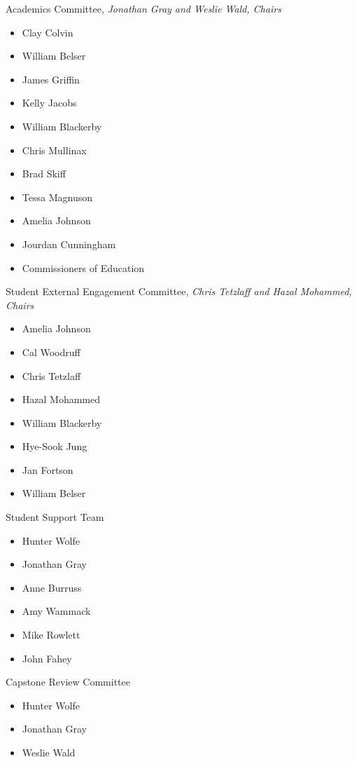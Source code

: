 Academics Committee, \emph{Jonathan Gray and Weslie Wald, Chairs}
\begin{itemize}\itemsep=0mm
  \item[] Clay Colvin
  \item[] William Belser
  \item[] James Griffin
  \item[] Kelly Jacobs
  \item[] William Blackerby
  \item[] Chris Mullinax 
  \item[] Brad Skiff 
  \item[] Tessa Magnuson    
  \item[] Amelia Johnson             
  \item[] Jourdan Cunningham
  \item[] Commissioners of Education
\end{itemize}\etc

\newpage

Student External Engagement Committee, \emph{Chris Tetzlaff and Hazal Mohammed, Chairs}
  \begin{itemize}\itemsep=0mm
    \item[] Amelia Johnson
    \item[] Cal Woodruff
    \item[] Chris Tetzlaff
    \item[] Hazal Mohammed
    \item[] William Blackerby
    \item[] Hye-Sook Jung
    \item[] Jan Fortson
    \item[] William Belser
  \end{itemize}\etc
  


Student Support Team
  \begin{itemize}\itemsep=0mm
    \item[] Hunter Wolfe
    \item[] Jonathan Gray
    \item[] Anne Burruss
    \item[] Amy Wammack
    \item[] Mike Rowlett
    \item[] John Fahey
  \end{itemize}\etc
  
Capstone Review Committee
  \begin{itemize}\itemsep=0mm
    \item[] Hunter Wolfe
    \item[] Jonathan Gray
    \item[] Weslie Wald
  \end{itemize}\etc  
  

